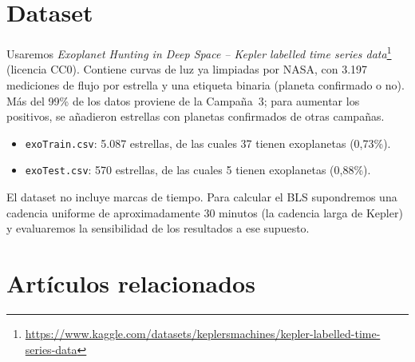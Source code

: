 \documentclass[11pt,a4paper]{article}
\begin{document}
\section{Dataset}

Usaremos \emph{Exoplanet Hunting in Deep Space -- Kepler labelled time series
data}\footnote{\url{https://www.kaggle.com/datasets/keplersmachines/kepler-labelled-time-series-data}}
(licencia CC0). Contiene curvas de luz ya limpiadas por NASA, con 3.197
mediciones de flujo por estrella y una etiqueta binaria (planeta confirmado o
no). Más del 99\% de los datos proviene de la Campaña~3; para aumentar los
positivos, se añadieron estrellas con planetas confirmados de otras campañas.
\begin{itemize}[label=\textbullet]
  \item \texttt{exoTrain.csv}: 5.087 estrellas, de las cuales 37 tienen
  exoplanetas (0{,}73\%).
  \item \texttt{exoTest.csv}: 570 estrellas, de las cuales 5 tienen
  exoplanetas (0{,}88\%).
\end{itemize}
El dataset no incluye marcas de tiempo. Para calcular el BLS supondremos una
cadencia uniforme de aproximadamente 30 minutos (la cadencia larga de Kepler) y
evaluaremos la sensibilidad de los resultados a ese supuesto.

\section{Artículos relacionados}

\begingroup
\renewcommand{\section}[2]{}%
\small


\endgroup
\end{document}
